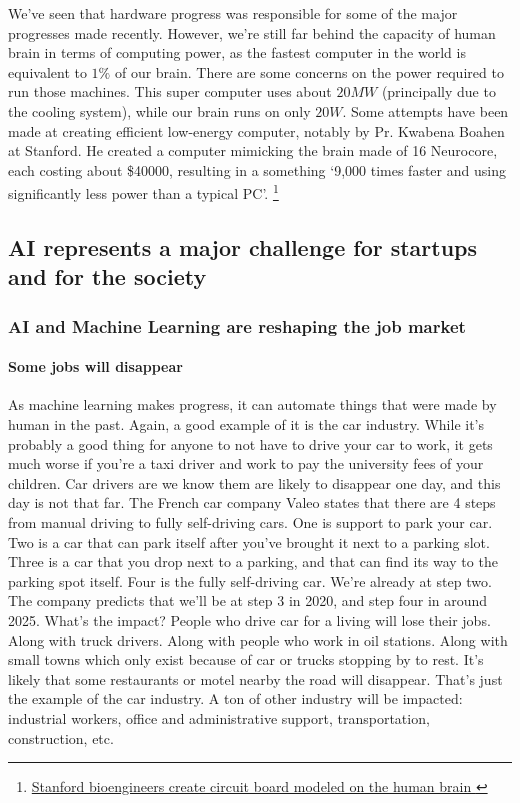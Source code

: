 \documentclass[12pt]{article}
\begin{document}
We've seen that hardware progress was responsible for some of the major
progresses  made recently. However, we're still far behind the capacity of human
brain in terms of computing power, as the fastest computer in the world is
equivalent to $1\%$ of  our brain. There are some concerns on the power required
to run those machines. This super computer uses about $20MW$
(principally due to the cooling system), while our brain runs on only $20 W$.
Some
attempts have been made at creating efficient low-energy computer, notably by
Pr. Kwabena Boahen at Stanford. He created a computer mimicking the brain made
of 16 Neurocore, each costing about \$40000,  resulting in a something \lq 9,000
times faster and using significantly less power than a typical PC\rq.
\footnote{\href{http://news.stanford.edu/news/2014/april/neurogrid-boahen-engineering-042814.html}{Stanford
bioengineers create circuit board modeled on the human brain }}

\subsection{AI represents a major challenge for startups and for the society}

\subsubsection{AI and Machine Learning are reshaping the job market}

\paragraph{Some jobs will disappear}

As machine learning makes progress, it can automate things that were made by
human in the past. Again, a good example of it is the car industry. While it's
probably a good thing for anyone to not have to drive your car to work, it gets
much worse if you're a taxi driver and work to pay the university fees of your
children. Car drivers are we know them are likely to disappear one day, and this
day is not that far. The French car company Valeo states that there are 4 steps
from manual driving to fully self-driving cars. One is support to park your car.
Two is a car that can park itself after you've brought it next to a parking
slot. Three is a car that you drop next to a parking, and that can find its way
to the parking spot itself. Four is the fully self-driving car. We're already at
step two. The company predicts that we'll be at step 3 in 2020, and step four in
around 2025. What's the impact? People who drive car for a living will lose
their jobs. Along with truck drivers. Along with people who work in oil
stations. Along with small towns which only exist because of car or trucks
stopping by to rest. It's likely that some restaurants or motel nearby the road
will disappear. That's just the example of the car industry. A ton of other
industry will be impacted: industrial workers, office and administrative
support, transportation, construction, etc.
\end{document}
